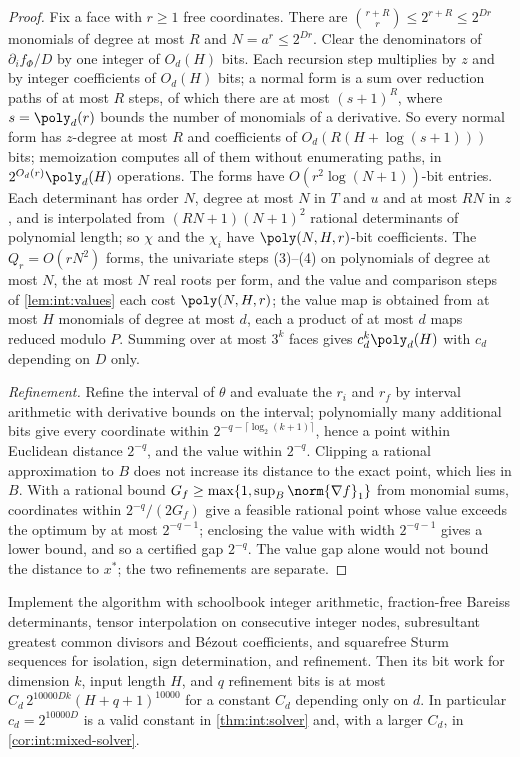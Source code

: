 \begin{proof}
Fix a face with $r\ge1$ free coordinates. There are
$\binom{r+R}r\le2^{r+R}\le2^{Dr}$ monomials of degree at most $R$ and
$N=a^r\le2^{Dr}$. Clear the denominators of $\partial_if_\Phi/D$ by one integer of
$O_d(H)$ bits. Each recursion step multiplies by $z$ and by integer coefficients
of $O_d(H)$ bits; a normal form is a sum over reduction paths of at most $R$
steps, of which there are at most $(s+1)^R$, where $s=\poly_d(r)$ bounds the
number of monomials of a derivative. So every normal form has $z$-degree at most
$R$ and coefficients of $O_d(R(H+\log(s+1)))$ bits; memoization computes all of
them without enumerating paths, in $2^{O_d(r)}\poly_d(H)$ operations. The forms
have $O(r^2\log(N+1))$-bit entries. Each determinant has order $N$, degree at
most $N$ in $T$ and $u$ and at most $RN$ in $z$, and is interpolated from
$(RN+1)(N+1)^2$ rational determinants of polynomial length; so $\chi$ and the
$\chi_i$ have $\poly(N,H,r)$-bit coefficients. The $Q_r=O(rN^2)$ forms, the
univariate steps (3)--(4) on polynomials of degree at most $N$, the at most $N$
real roots per form, and the value and comparison steps of
\cref{lem:int:values} each cost $\poly(N,H,r)$; the value map is obtained from
at most $H$ monomials of degree at most $d$, each a product of at most $d$
maps reduced modulo $P$. Summing over at most $3^k$ faces gives
$c_d^k\poly_d(H)$ with $c_d$ depending on $D$ only.

\emph{Refinement.} Refine the interval of $\theta$ and evaluate the $r_i$ and
$r_f$ by interval arithmetic with derivative bounds on the interval;
polynomially many additional bits give every coordinate within
$2^{-q-\lceil\log_2(k+1)\rceil}$, hence a point within Euclidean distance
$2^{-q}$, and the value within $2^{-q}$. Clipping a rational approximation to
$B$ does not increase its distance to the exact point, which lies in $B$. With
a rational bound $G_f\ge\max\{1,\sup_B\norm{\nabla f}_1\}$ from monomial sums,
coordinates within $2^{-q}/(2G_f)$ give a feasible rational point whose value
exceeds the optimum by at most $2^{-q-1}$; enclosing the value with width
$2^{-q-1}$ gives a lower bound, and so a certified gap $2^{-q}$. The value
gap alone would not bound the distance to $x^*$; the two refinements are
separate.
\end{proof}

\begin{lemma}\label{lem:int:budget}
Implement the algorithm with schoolbook integer arithmetic, fraction-free
Bareiss determinants, tensor interpolation on consecutive integer nodes,
subresultant greatest common divisors and B\'ezout coefficients, and squarefree
Sturm sequences for isolation, sign determination, and refinement. Then its bit
work for dimension $k$, input length $H$, and $q$ refinement bits is at most
$C_d\,2^{10000Dk}(H+q+1)^{10000}$ for a constant $C_d$ depending only on $d$. In
particular $c_d=2^{10000D}$ is a valid constant in \cref{thm:int:solver} and,
with a larger $C_d$, in \cref{cor:int:mixed-solver}.
\end{lemma}

